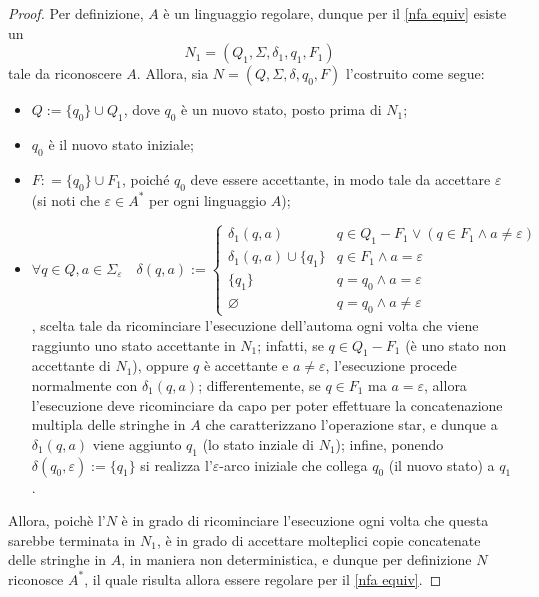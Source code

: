 \documentclass[a4paper, 12pt]{report}
\begin{document}
    \begin{proof}
        Per definizione, $A$ è un linguaggio regolare, dunque per il \cref{nfa equiv} esiste un \NFA $$N_1 = (Q_1, \Sigma, \delta_1, q_1, F_1)$$ tale da riconoscere $A$. Allora, sia $N = (Q, \Sigma, \delta, q_0, F)$ l'\NFA costruito come segue:

        \begin{itemize}
            \item $Q := \{q_0\} \cup Q_1$, dove $q_0$ è un nuovo stato, posto prima di $N_1$;
            \item $q_0$ è il nuovo stato iniziale;
            \item $F: = \{q_0\} \cup F_1$, poiché $q_0$ deve essere accettante, in modo tale da accettare $\varepsilon$ (si noti che $\varepsilon \in A^*$ per ogni linguaggio $A$);
            \item $\forall q \in Q, a \in \Sigma_\varepsilon \quad \delta(q, a) := \left \{ \begin{array}{ll} \delta_1(q, a) & q \in Q_1 - F_1 \lor (q \in F_1 \land a \neq \varepsilon) \\ \delta_1(q, a) \cup \{q_1\} & q \in F_1 \land a = \varepsilon \\ \{q_1\} & q = q_0 \land a = \varepsilon \\ \varnothing & q = q_0 \land a \neq \varepsilon \end{array} \right.$, scelta tale da ricominciare l'esecuzione dell'automa ogni volta che viene raggiunto uno stato accettante in $N_1$; infatti, se $q \in Q_1 - F_1$ (è uno stato non accettante di $N_1$), oppure $q$ è accettante e $a \neq \varepsilon$, l'esecuzione procede normalmente con $\delta_1(q, a)$; differentemente, se $q \in F_1$ ma $a = \varepsilon$, allora l'esecuzione deve ricominciare da capo per poter effettuare la concatenazione multipla delle stringhe in $A$ che caratterizzano l'operazione star, e dunque a $\delta_1(q, a)$ viene aggiunto $q_1$ (lo stato inziale di $N_1$); infine, ponendo $\delta(q_0, \varepsilon) := \{q_1\}$ si realizza l'$\varepsilon$-arco iniziale che collega $q_0$ (il nuovo stato) a $q_1$.
        \end{itemize}

        
        Allora, poichè l'\NFA $N$ è in grado di ricominciare l'esecuzione ogni volta che questa sarebbe terminata in $N_1$, è in grado di accettare molteplici copie concatenate delle stringhe in $A$, in maniera non deterministica, e dunque per definizione $N$ riconosce $A^*$, il quale risulta allora essere regolare per il \cref{nfa equiv}.
    \end{proof}
\end{document}
